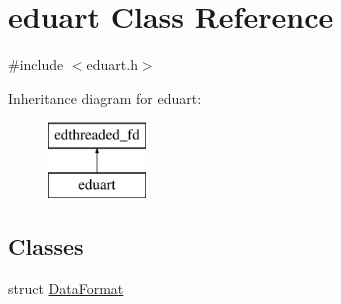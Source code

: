 \hypertarget{classeduart}{\section{eduart Class Reference}
\label{classeduart}
}


{\ttfamily \#include $<$eduart.\-h$>$}

Inheritance diagram for eduart\-:\begin{figure}[H]
\begin{center}
\leavevmode
\includegraphics[height=2.000000cm]{classeduart}
\end{center}
\end{figure}
\subsection*{Classes}
\begin{DoxyCompactItemize}
\item 
struct \hyperlink{structeduart_1_1DataFormat}{Data\-Format}
\end{DoxyCompactItemize}
